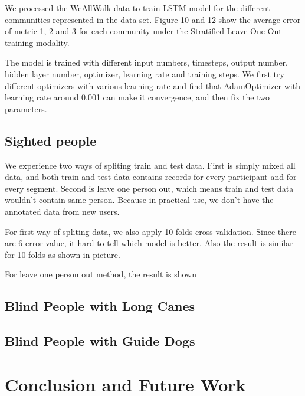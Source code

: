 \documentclass[11pt]{article}
\begin{document}
We processed the WeAllWalk data to train LSTM model for the different communities represented in the data set. Figure 10 and 12 show the average error of metric 1, 2 and 3 for each community under the Stratified Leave-One-Out training modality.

The model is trained with different input numbers, timesteps, output number, hidden layer number, optimizer, learning rate and training steps. We first try different optimizers with various learning rate and find that AdamOptimizer with learning rate around 0.001 can make it convergence, and then fix the two parameters.

\subsection{Sighted people}
We experience two ways of spliting train and test data. First is simply mixed all data, and both train and test data contains records for every participant and for every segment. Second is leave one person out, which means train and test data wouldn't contain same person. Because in practical use, we don't have the annotated data from new users.

For first way of spliting data, we also apply 10 folds cross validation. Since there are 6 error value, it hard to tell which model is better. Also the result is similar for 10 folds as shown in picture.

For leave one person out method, the result is shown





\subsection{Blind People with Long Canes}





\subsection{Blind People with Guide Dogs}










\section{Conclusion and Future Work}
\end{document}
